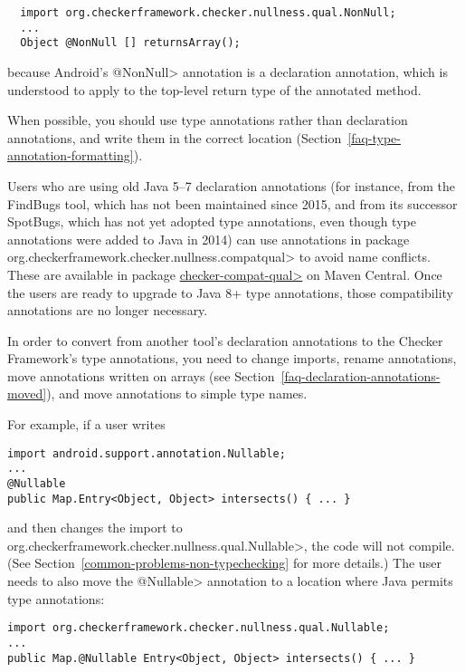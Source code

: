 \begin{Verbatim}
  import org.checkerframework.checker.nullness.qual.NonNull;
  ...
  Object @NonNull [] returnsArray();
\end{Verbatim}

\noindent
because Android's \<@NonNull> annotation is a declaration annotation, which
is understood to apply to the top-level return type of the annotated method.

When possible, you should use type annotations rather than declaration
annotations, and write them in the correct location
(Section~\ref{faq-type-annotation-formatting}).

Users who are using old Java 5--7 declaration annotations (for instance,
from the FindBugs tool, which has not been maintained since 2015, and from
its successor SpotBugs, which has not yet adopted type annotations, even
though type annotations were added to Java in 2014) can use annotations in
package \<org.checkerframework.checker.nullness.compatqual> to avoid name
conflicts.  These are available in package
\href{https://search.maven.org/search?q=a:checker-compat-qual}{\<checker-compat-qual>}
on Maven Central.  Once the users are ready to upgrade to Java 8+ type
annotations, those compatibility annotations are no longer necessary.



In order to convert from another tool's declaration annotations to the Checker Framework's type annotations,
you need to change imports, rename annotations, move annotations written on arrays (see Section~\ref{faq-declaration-annotations-moved}), and move annotations to simple type names.

For example, if a user writes

\begin{Verbatim}
import android.support.annotation.Nullable;
...
@Nullable
public Map.Entry<Object, Object> intersects() { ... }
\end{Verbatim}

\noindent
and then changes the import to
\<org.checkerframework.checker.nullness.qual.Nullable>, the code will not
compile.  (See Section~\ref{common-problems-non-typechecking} for more details.)
The user needs to also move the \<@Nullable> annotation to a location where
Java permits type annotations:

\begin{Verbatim}
import org.checkerframework.checker.nullness.qual.Nullable;
...
public Map.@Nullable Entry<Object, Object> intersects() { ... }
\end{Verbatim}


